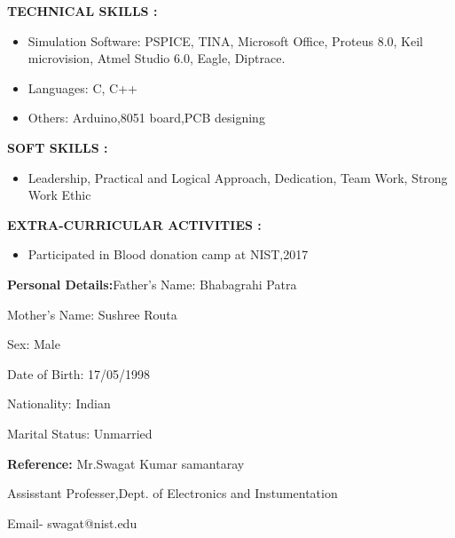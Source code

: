 \documentclass[a4]{article}
\begin{document}
\vspace{3mm}
\textbf{TECHNICAL SKILLS : } 
\begin{itemize}
	\item Simulation Software: PSPICE, TINA, Microsoft Office, Proteus 8.0, Keil microvision, Atmel Studio 6.0, Eagle, Diptrace.
	\item Languages: C, C++
        \item Others: Arduino,8051 board,PCB designing

\end{itemize}

\vspace{3mm}
\textbf{SOFT SKILLS : } 
\begin{itemize}
	\item  Leadership,  Practical  and Logical Approach, Dedication, Team Work, Strong Work Ethic

\end{itemize}

\vspace{3mm}
\textbf{EXTRA-CURRICULAR ACTIVITIES : } 
\begin{itemize}
	\item Participated in Blood donation camp at NIST,2017
\end{itemize}

\vspace{3mm}
\textbf{Personal Details:}\hspace{.4cm}Father's Name: Bhabagrahi Patra

\hspace{3.4cm}Mother's Name: Sushree Routa

\hspace{3.4cm}Sex: Male

\hspace{3.4cm}Date of Birth: 17/05/1998

\hspace{3.4cm}Nationality: Indian

\hspace{3.4cm}Marital Status: Unmarried

\vspace{3mm}
\textbf{Reference: }
\hspace{1cm} Mr.Swagat Kumar samantaray

\hspace{3.4cm}Assisstant Professer,Dept. of Electronics and Instumentation

\hspace{3.4cm}Email- swagat@nist.edu
\end{document}
